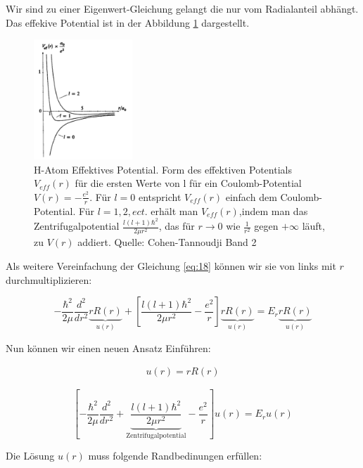 Wir sind zu einer Eigenwert-Gleichung gelangt die nur vom Radialanteil abhängt. Das effekive Potential ist in der Abbildung \ref{fig:1} dargestellt.

\begin{figure}[ht]
	\centering
  \includegraphics[width=0.33\textwidth]{h-atom_pics/Veff.png}
	\caption{H-Atom Effektives Potential. Form des effektiven Potentials \(V_{eff}(r)\) für die ersten Werte von l für ein Coulomb-Potential \(V(r) = -\frac{e^2}{r}\). Für \(l=0\) entspricht \(V_{eff}(r)\) einfach dem Coulomb-Potential. Für \(l=1,2,ect.\) erhält man \(V_{eff}(r)\),indem man das Zentrifugalpotential \(\frac{l(l+1)\hbar^2}{2\mu r^2}\), das für \(r\to 0\) wie \(\frac{1}{r^2}\) gegen \(+\infty\) läuft, zu \(V(r)\) addiert. Quelle: Cohen-Tannoudji Band 2 }
	\label{fig:1}
\end{figure}

Als weitere Vereinfachung der Gleichung \eqref{eq:18} können wir sie von links mit \(r\) durchmultiplizieren:

\begin{equation}
  \label{eq:19}
   - \frac{\hbar^2}{2\mu}\frac{d^2}{dr^2}\underbrace{r R(r)}_{u(r)} + \left[\frac{l(l+1)\hbar^2}{2\mu r^2}  - \frac{e^2}{r}\right] \underbrace{r R(r)}_{u(r)}   = E_r \underbrace{r R(r)}_{u(r)}
\end{equation}

Nun können wir einen neuen Ansatz Einführen:

\begin{align}
  \label{eq:30}
  u(r) = rR(r)
\end{align}


\begin{equation}
  \label{eq:20}
    \left[-\frac{\hbar^2}{2\mu}\frac{d^2}{dr^2} + \underbrace{\frac{l(l+1)\hbar^2}{2\mu r^2}}_{\text{Zentrifugalpotential}}  - \frac{e^2}{r}\right] u(r)   = E_r u(r)
\end{equation}

Die Lösung \(u(r)\) muss folgende Randbedinungen erfüllen:

